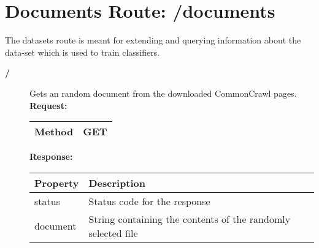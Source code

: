 \section{Documents Route: /documents}
The datasets route is meant for extending and querying information about the data-set which is used to train classifiers. 

\begin{description}


\item [{\large \textbf{/}}]
Gets an random document from the downloaded CommonCrawl pages.
\newline
\newline
\textbf{Request:}
\newline
\newline
\begin{tabular}{ | l | l |}
\hline
Method & GET\\ \hline
\end{tabular}
\newline
\newline
\textbf{Response:}
\newline
\newline
\resizebox{\textwidth}{!} {
\begin{tabular}{ | l | l |}
\hline
\textbf{Property} & \textbf{Description}\\ \hline
status & Status code for the response\\ \hline
document & String containing the contents of the randomly selected file\\ \hline
\end{tabular}}

\end{description}